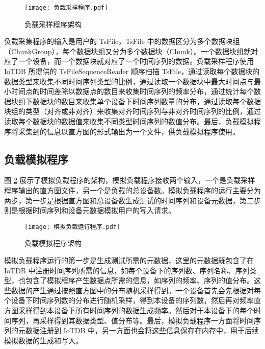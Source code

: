 \begin{figure}
  \centering
  \texttt{[image: 负载采样程序.pdf]}
  \caption{负载采样程序架构}
  \label{fig:load-sampling-program}
\end{figure}

负载采集程序的输入是用户的 TsFile，TsFile 中的数据区分为多个数据块组（ChunkGroup），每个数据块组又分为多个数据块（Chunk）。一个数据块组就对应了一个设备，而一个数据块就对应了一个时间序列的数据。负载采样程序使用 IoTDB 所提供的 TsFileSequenceReader 顺序扫描 TsFile，通过读取每个数据块的数据类型来收集不同时间序列类型的比例，通过读取一个数据块中最大时间点与最小时间点的时间差除以数据点的数目来收集时间序列的频率分布，通过统计每个数据块组下数据块的数目来收集单个设备下时间序列数量的分布，通过读取每个数据块组的类型（对齐或非对齐）来收集对齐时间序列与非对齐时间序列的比例，通过读取每个数据块的数据值来收集不同类型时间序列的数值分布。最后，负载模拟程序将采集到的信息以直方图的形式输出为一个文件，供负载模拟程序使用。

\subsection{负载模拟程序}
图 \ref{fig:load-simulation-program} 展示了模拟负载程序的架构，模拟负载程序接收两个输入，一个是负载采样程序输出的直方图文件，另一个是负载的总设备数。模拟负载程序的运行主要分为两步，第一步是根据直方图和总设备数生成测试的时间序列和设备元数据，第二步则是根据时间序列和设备元数据模拟用户的写入请求。

\begin{figure}
  \centering
  \texttt{[image: 模拟负载运行程序.pdf]}
  \caption{负载模拟程序架构}
  \label{fig:load-simulation-program}
\end{figure}

模拟负载程序运行的第一步是生成测试所需的元数据，这里的元数据既包含了在 IoTDB 中注册时间序列所需的信息，如每个设备下的序列数、序列名称、序列类型，也包含了模拟程序产生数据点所需的信息，如序列的频率、序列的值分布。这些数据的产生通过按照直方图中的分布随机采样得到。一个设备首先会先根据对每个设备下时间序列数的分布进行随机采样，得到本设备的序列数，然后再对频率直方图采样得到本设备下所有时间序列的数据生成频率。然后对于本设备下的每个时间序列，再采样得到其数据类型、值分布等。最后，模拟负载程序一方面将时间序列的元数据注册到 IoTDB 中，另一方面也会将这些信息保存在内存中，用于后续模拟数据的生成和写入。

